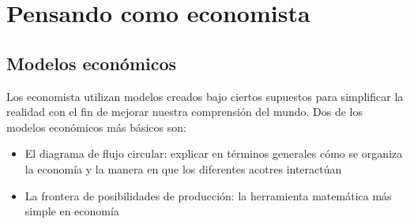 \section{Pensando como economista}
\subsection{Modelos económicos}
Los economista utilizan modelos creados bajo ciertos supuestos para simplificar la realidad con el fin de mejorar nuestra comprensión del mundo. Dos de los modelos económicos más básicos son:
\begin{itemize}
	\item El diagrama de flujo circular: explicar en términos generales cómo se organiza la economía y la manera en que los diferentes acotres interactúan
	\item La frontera de posibilidades de producción: la herramienta matemática más simple en economía
\end{itemize}

